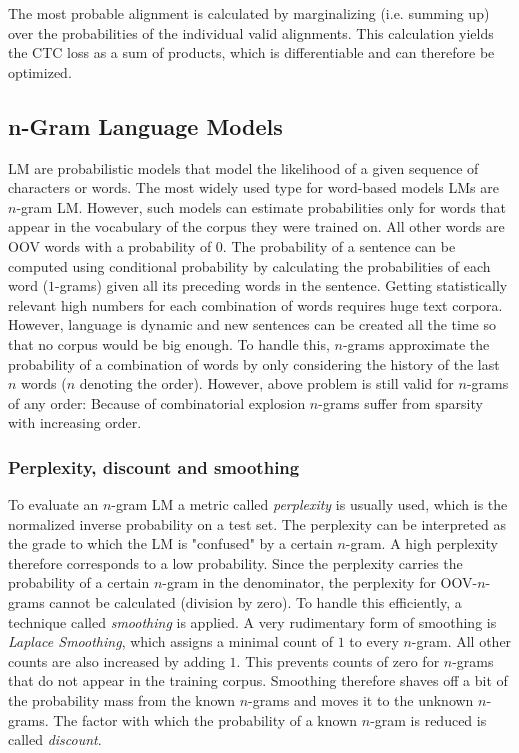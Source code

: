 The most probable alignment is calculated by marginalizing (i.e. summing up) over the probabilities of the individual valid alignments. This calculation yields the CTC loss as a sum of products, which is differentiable and can therefore be optimized.

\subsection{n-Gram Language Models}\label{n-gram-summary}

\ac{LM} are probabilistic models that model the likelihood of a given sequence of characters or words. The most widely used type for word-based models \ac{LM}s are $n$-gram \ac{LM}. However, such models can estimate probabilities only for words that appear in the vocabulary of the corpus they were trained on. All other words are \ac{OOV} words with a probability of $0$. The probability of a sentence can be computed using conditional probability by calculating the probabilities of each word ($1$-grams) given all its preceding words in the sentence. Getting statistically relevant high numbers for each combination of words requires huge text corpora. However, language is dynamic and new sentences can be created all the time so that no corpus would be big enough. To handle this, $n$-grams approximate the probability of a combination of words by only considering the history of the last $n$ words ($n$ denoting the order). However, above problem is still valid for $n$-grams of any order: Because of combinatorial explosion $n$-grams suffer from sparsity with increasing order. 

\subsubsection{Perplexity, discount and smoothing}

To evaluate an $n$-gram \ac{LM} a metric called \textit{perplexity} is usually used, which is the normalized inverse probability on a test set. The perplexity can be interpreted as the grade to which the \ac{LM} is "confused" by a certain $n$-gram. A high perplexity therefore corresponds to a low probability. Since the perplexity carries the probability of a certain $n$-gram in the denominator, the perplexity for \ac{OOV}-$n$-grams cannot be calculated (division by zero). To handle this efficiently, a technique called \textit{smoothing} is applied. A very rudimentary form of smoothing is \textit{Laplace Smoothing}, which assigns a minimal count of $1$ to every $n$-gram. All other counts are also increased by adding $1$. This prevents counts of zero for $n$-grams that do not appear in the training corpus. Smoothing therefore shaves off a bit of the probability mass from the known $n$-grams and moves it to the unknown $n$-grams. The factor with which the probability of a known $n$-gram is reduced is called \textit{discount}. 

